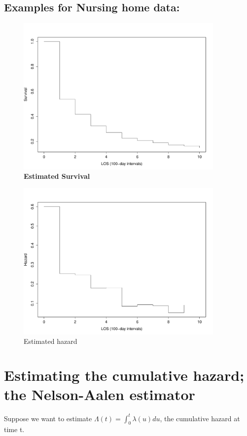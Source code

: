\documentclass[11pt,slidesonly,semrot,portrait,palatino]{book}
\begin{document}
\subsection{Examples for Nursing home data:}
\vspace*{-.05in}
\begin{figure}[h!]
  \centering
\centerline{\includegraphics[width=4in]{nhact_surv.pdf}}
\caption{\bf Estimated Survival}
\end{figure}
\begin{figure}[h!]
\centerline{\includegraphics[width=4in]{nhact_haz.pdf}}
\caption{Estimated hazard}
\end{figure}
\newpage
\section{Estimating the cumulative hazard; the Nelson-Aalen estimator}
Suppose we want to estimate $\Lambda(t) = \int_{0}^{t} \lambda(u) du$, the
cumulative hazard at time t.
\end{document}
